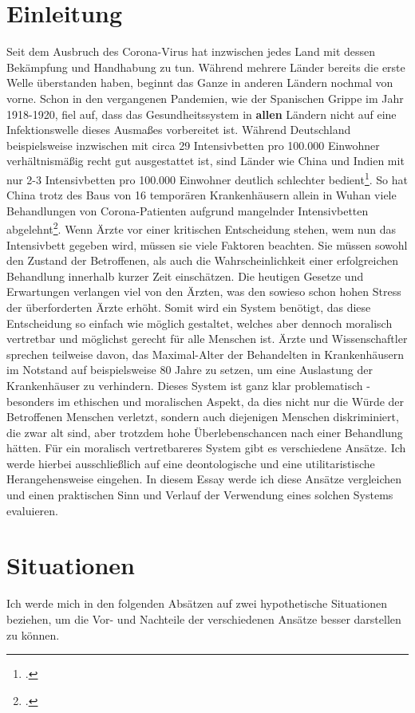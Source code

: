 \documentclass[a4paper]{article}
\begin{document}
\section{Einleitung}
Seit dem Ausbruch des Corona-Virus hat inzwischen jedes Land mit dessen Bekämpfung und Handhabung zu tun. Während mehrere Länder bereits die erste Welle überstanden haben, beginnt das Ganze in anderen Ländern nochmal von vorne. Schon in den vergangenen Pandemien, wie der Spanischen Grippe im Jahr 1918-1920, fiel auf, dass das Gesundheitssystem in \textbf{allen} Ländern nicht auf eine Infektionswelle dieses Ausmaßes vorbereitet ist. Während Deutschland beispielsweise inzwischen mit circa 29 Intensivbetten pro 100.000 Einwohner verhältnismäßig recht gut ausgestattet ist, sind Länder wie China und Indien mit nur 2-3 Intensivbetten pro 100.000 Einwohner deutlich schlechter bedient\footcite{statista}. So hat China trotz des Baus von 16 temporären Krankenhäusern allein in Wuhan viele Behandlungen von Corona-Patienten aufgrund mangelnder Intensivbetten abgelehnt\footcite{wuhanclosed}.
Wenn Ärzte vor einer kritischen Entscheidung stehen, wem nun das Intensivbett gegeben wird, müssen sie viele Faktoren beachten. Sie müssen sowohl den Zustand der Betroffenen, als auch die Wahrscheinlichkeit einer erfolgreichen Behandlung innerhalb kurzer Zeit einschätzen. Die heutigen Gesetze und Erwartungen verlangen viel von den Ärzten, was den sowieso schon hohen Stress der überforderten Ärzte erhöht. Somit wird ein System benötigt, das diese Entscheidung so einfach wie möglich gestaltet, welches aber dennoch moralisch vertretbar und möglichst gerecht für alle Menschen ist.
Ärzte und Wissenschaftler sprechen teilweise davon, das Maximal-Alter der Behandelten in Krankenhäusern im Notstand auf beispielsweise 80 Jahre zu setzen, um eine Auslastung der Krankenhäuser zu verhindern. Dieses System ist ganz klar problematisch - besonders im ethischen und moralischen Aspekt, da dies nicht nur die Würde der Betroffenen Menschen verletzt, sondern auch diejenigen Menschen diskriminiert, die zwar alt sind, aber trotzdem hohe Überlebenschancen nach einer Behandlung hätten. Für ein moralisch vertretbareres System gibt es verschiedene Ansätze. Ich werde hierbei ausschließlich auf eine deontologische und eine utilitaristische Herangehensweise eingehen. In diesem Essay werde ich diese Ansätze vergleichen und einen praktischen Sinn und Verlauf der Verwendung eines solchen Systems evaluieren.

\section{Situationen}
Ich werde mich in den folgenden Absätzen auf zwei hypothetische Situationen beziehen, um die Vor- und Nachteile der verschiedenen Ansätze besser darstellen zu können.
\end{document}
